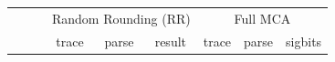 \documentclass[11pt]{article}
\begin{document}
\begin{table}[]
    \centering
    \small
    \begin{subfigure}[t]{\linewidth}
    \centering
    \begin{tabular}{|lll|c|c|c|c|c|c|}
    \hline
    \multicolumn{3}{|c}{ \multirow{2}{*}{Application} } & \multicolumn{3}{|c|}{Random Rounding (RR)} & \multicolumn{3}{c|}{Full MCA} \\
    \cline{4-9}
    & & & trace & parse & result & trace & parse & sigbits \\
    \hline
    

\end{tabular}
\end{subfigure}
\end{table}
\end{document}
